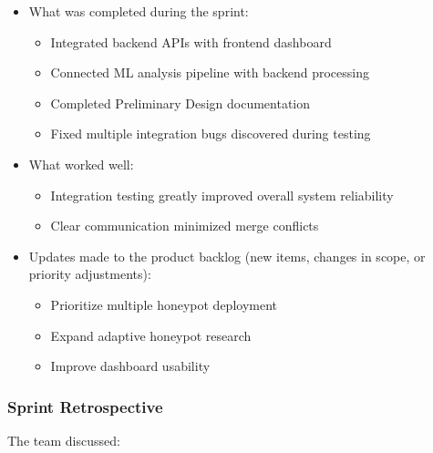 \documentclass{article}
\begin{document}
\begin{itemize}
    \item What was completed during the sprint:
    \begin{itemize}
    \item Integrated backend APIs with frontend dashboard
    \item Connected ML analysis pipeline with backend processing
    \item Completed Preliminary Design documentation 
    \item Fixed multiple integration bugs discovered during testing
    \end{itemize}

    \item What worked well:
    \begin{itemize}
    \item Integration testing greatly improved overall system reliability
    \item Clear communication minimized merge conflicts
    \end{itemize}
    \item Updates made to the product backlog (new items, changes in scope, or priority adjustments):
    \begin{itemize}
    \item Prioritize multiple honeypot deployment
    \item Expand adaptive honeypot research
    \item Improve dashboard usability
    \end{itemize}

\end{itemize}

\subsubsection{Sprint Retrospective}
The team discussed:
\end{document}
